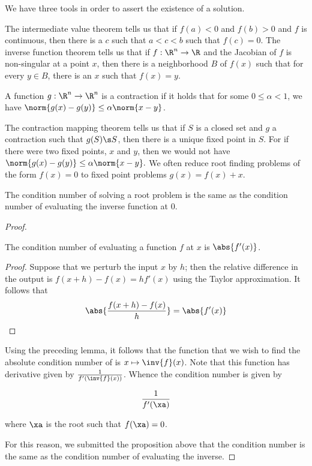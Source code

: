 \documentclass[../main.tex]{subfiles}
\begin{document}
    \begin{remark}
        We have three tools in order to assert the existence of a solution.
        \begin{outline}
            \1 The intermediate value theorem tells us that if $f(a) < 0$ and $f(b) > 0$ and $f$ is continuous, then there is a $c$ such that $a < c < b$ such that $f(c) = 0$.
            \1 The inverse function theorem tells us that if $f: \R^n \to \R$ and the Jacobian of $f$ is non-singular at a point $x$, then there is a neighborhood $B$ of $f(x)$ such that for every $y \in B$, there is an $x$ such that $f(x) = y$.
            \1 \begin{definition}
                A function $g: \R^n \to \R^n$ is a contraction if it holds that for some $0 \leq \alpha < 1$, we have $\norm{g(x) - g(y)} \leq \alpha \norm{x - y}$.
            \end{definition}
            \2 The contraction mapping theorem tells us that if $S$ is a closed set and $g$ a contraction such that $g(S) \s S$, then there is a unique fixed point in $S$.
            \3 For if there were two fixed points, $x$ and $y$, then we would not have $\norm{g(x) - g(y)} \leq \alpha \norm{x-y}.$
            \3 We often reduce root finding problems of the form $f(x) = 0$ to fixed point problems $g(x) = f(x) + x$.
        \end{outline}
    \end{remark}

    \begin{proposition}
        The condition number of solving a root problem is the same as the condition number of evaluating the inverse function at $0$.
    \end{proposition}
    \begin{proof}
        \begin{lemma}
            The condition number of evaluating a function $f$ at $x$ is $\abs{f'(x)}$.
        \end{lemma}
        \begin{proof}
            Suppose that we perturb the input $x$ by $h$; then the relative difference in the output is $f(x+h) - f(x) = hf'(x)$ using the Taylor approximation. It follows that 
            \[
                \abs{\frac{f(x+h) - f(x)}{h}} = \abs{f'(x)}
            \]
            
            
        \end{proof}

        Using the preceding lemma, it follows that the function that we wish to find the absolute condition number of is $x \mapsto \inv{f}(x)$.
        Note that this function has derivative given by $\frac{1}{f'(\inv{f}(x))}$. Whence the condition number is given by

        \[
            \frac{1}{f'(\xa)}
        \]

        where $\xa$ is the root such that $f(\xa) = 0$.

        For this reason, we submitted the proposition above that the condition number is the same as the condition number of evaluating the inverse.
    \end{proof}
\end{document}
